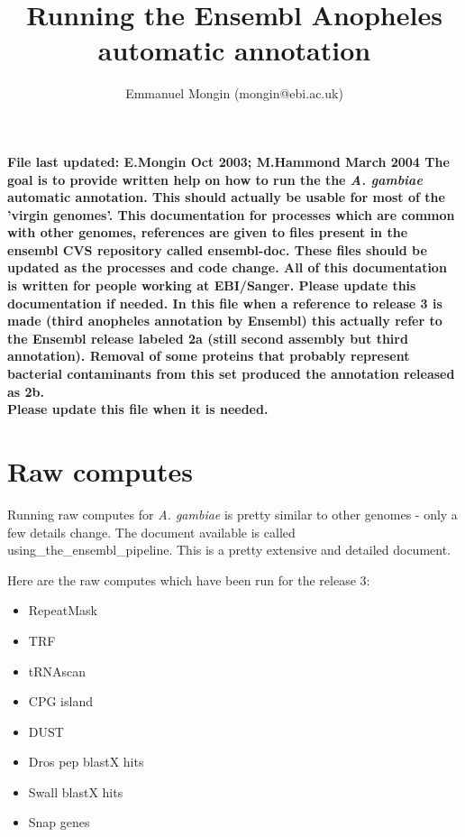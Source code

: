 \documentclass[a4paper,10pt]{article}
\title{Running the Ensembl Anopheles automatic annotation}
\author{Emmanuel Mongin (mongin@ebi.ac.uk)}
\begin{document}
\maketitle


\bf{File last updated: E.Mongin Oct 2003; M.Hammond March 2004}
The goal is to provide written help on how to run the the \textit{A. gambiae} automatic annotation. This should actually be usable for most of the 'virgin genomes'. This documentation for processes which are common with other genomes, references are given to files present in the ensembl CVS repository called ensembl-doc. These files should be updated as the processes and code change. All of this documentation is written for people working at EBI/Sanger. Please update this documentation if needed. In this file when a reference to release 3 is made (third anopheles annotation by Ensembl) this actually refer to the Ensembl release labeled 2a (still second assembly but third annotation). Removal of some proteins that probably represent bacterial contaminants from this set produced the annotation released as 2b.\\
\bf{Please update this file when it is needed.}

\section{Raw computes}
Running raw computes for \textit{A. gambiae} is pretty similar to other genomes -  only a few details change.
The document available is called using\_the\_ensembl\_pipeline. This is a pretty extensive and detailed document.

Here are the raw computes which have been run for the release 3:
\begin{itemize}
\item RepeatMask
\item TRF
\item tRNAscan
\item CPG island
\item DUST
\item Dros pep blastX hits
\item Swall blastX hits
\item Snap genes
\end{itemize}
\end{document}
